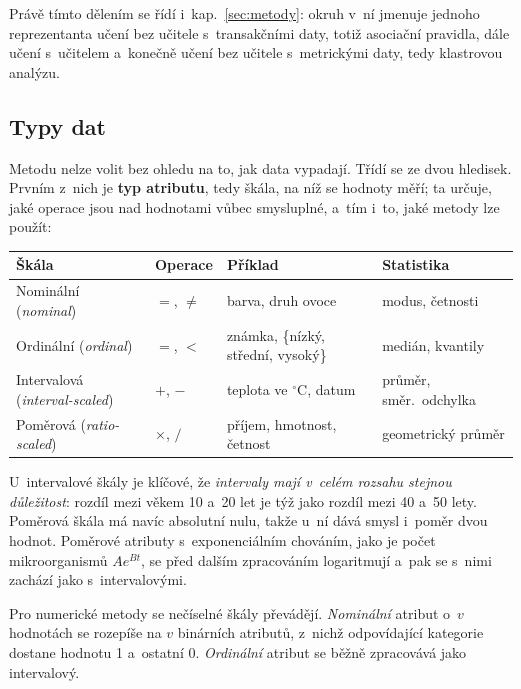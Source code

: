 \documentclass[11pt,a4paper]{article}
\theoremstyle{definition}
\begin{document}
Právě tímto dělením se řídí i~kap.~\ref{sec:metody}: okruh v~ní jmenuje jednoho
reprezentanta učení bez učitele s~transakčními daty, totiž asociační pravidla, dále učení
s~učitelem a~konečně učení bez učitele s~metrickými daty, tedy klastrovou analýzu.

\subsection{Typy dat}

Metodu nelze volit bez ohledu na to, jak data vypadají. Třídí se ze dvou hledisek. Prvním
z~nich je \textbf{typ atributu}, tedy škála, na níž se hodnoty měří; ta určuje, jaké
operace jsou nad hodnotami vůbec smysluplné, a~tím i~to, jaké metody lze použít:

\begin{center}
\small
\begin{tabular}{@{}p{3.3cm}p{2.2cm}p{5.2cm}p{4.0cm}@{}}
\toprule
\textbf{Škála} & \textbf{Operace} & \textbf{Příklad} & \textbf{Statistika} \\
\midrule
Nominální (\emph{nominal}) & $=$, $\neq$ & barva, druh ovoce & modus, četnosti \\
Ordinální (\emph{ordinal}) & $=$, $<$ & známka, \{nízký, střední, vysoký\} & medián,
  kvantily \\
Intervalová (\emph{interval-scaled}) & $+$, $-$ & teplota ve $^{\circ}$C, datum & průměr,
  směr.\ odchylka \\
Poměrová (\emph{ratio-scaled}) & $\times$, $/$ & příjem, hmotnost, četnost & geometrický
  průměr \\
\bottomrule
\end{tabular}
\end{center}

U~intervalové škály je klíčové, že \emph{intervaly mají v~celém rozsahu stejnou
důležitost}: rozdíl mezi věkem 10 a~20 let je týž jako rozdíl mezi 40 a~50 lety. Poměrová
škála má navíc absolutní nulu, takže u~ní dává smysl i~poměr dvou hodnot. Poměrové
atributy s~exponenciálním chováním, jako je počet mikroorganismů $Ae^{Bt}$, se před dalším
zpracováním logaritmují a~pak se s~nimi zachází jako s~intervalovými.

Pro numerické metody se nečíselné škály převádějí. \emph{Nominální} atribut o~$v$
hodnotách se rozepíše na $v$ binárních atributů, z~nichž odpovídající kategorie dostane
hodnotu 1 a~ostatní 0. \emph{Ordinální} atribut se běžně zpracovává jako intervalový.
\end{document}
